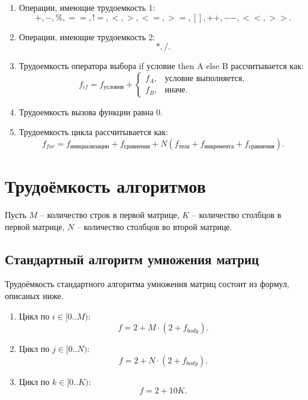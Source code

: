 \documentclass[a4paper,14pt, unknownkeysallowed]{extreport}
\begin{document}
\begin{enumerate}
	\item[1)] Операции, имеющие трудоемкость 1:
	\begin{equation*}
	   +, -, \%, ==, !=, <, >, <=, >=, [], ++, {-}-, {<}<, {>}>.
	\end{equation*}
	\item[2)] Операции, имеющие трудоемкость 2:
	\begin{equation*}
		*, /.
	\end{equation*}
	\item[3)] Трудоемкость оператора выбора if условие then A else B рассчитывается как:
	\begin{equation*}
		f_{if} = f_{\text{условия}} +
	\begin{cases}
		f_A, & \text{условие выполняется,}\\
		f_B, & \text{иначе.}
	\end{cases}
	\end{equation*}
	\item[4)] Трудоемкость вызова функции равна 0.
	\item[5)] Трудоемкость цикла рассчитывается как:
	\begin{equation*}
		f_{for} = f_{\text{инициализации}} + f_{\text{сравнения}} + N(f_{\text{тела}} + f_{\text{инкремента}} + f_{\text{сравнения}}).
	\end{equation*}
\end{enumerate}
	
\section{Трудоёмкость алгоритмов}

Пусть $M$ -- количество строк в первой матрице, $K$ -- количество столбцов в первой матрице, $N$ -- количество столбцов во второй матрице.
	
\subsection{Стандартный алгоритм умножения матриц}

Трудоёмкость стандартного алгоритма умножения матриц состоит из формул, описаных ниже.

\clearpage

\begin{enumerate}
	\item[1)] Цикл по $i \in [0..M)$:
    \begin{equation}
        f = 2 + M \cdot (2 + f_{body}).
    \end{equation}
    
	\item[2)] Цикл по $j \in [0..N)$: 
    \begin{equation}
        f = 2 + N \cdot (2 + f_{body}).
    \end{equation}
	\item[3)] Цикл по $k \in [0..K)$:
    \begin{equation}
        f = 2 + 10K.
    \end{equation}
\end{enumerate}
	
\end{document}
